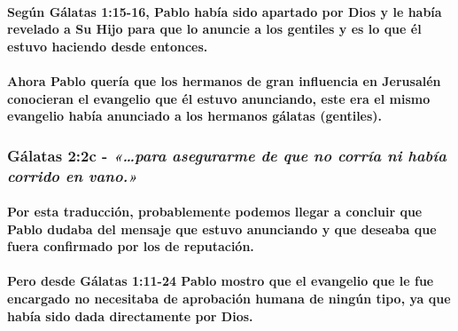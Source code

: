 \documentclass[11a pt,twoside]{article}
\newcommand{\scripture}[1]{%
  {\fontsize{12pt}{16pt}\selectfont\ScriptureFont\itshape #1}%
}
\def\textbf#1{#1}%
\let\oldsubsubsection\subsubsection
\renewcommand{\subsubsection}{\needspace{4\baselineskip}\oldsubsubsection}
\let\oldparagraph\paragraph
\renewcommand{\paragraph}{\needspace{3\baselineskip}\oldparagraph}
\begin{document}
\paragraph{Según Gálatas 1:15-16, Pablo había sido apartado por Dios y
le había revelado a Su Hijo para que lo anuncie a los gentiles y es lo
que él estuvo haciendo desde
entonces.}\label{seguxfan-guxe1latas-115-16-pablo-habuxeda-sido-apartado-por-dios-y-le-habuxeda-revelado-a-su-hijo-para-que-lo-anuncie-a-los-gentiles-y-es-lo-que-uxe9l-estuvo-haciendo-desde-entonces.}

\paragraph{\texorpdfstring{Ahora Pablo quería que los hermanos de gran
influencia en Jerusalén conocieran el evangelio que él estuvo
anunciando, este era \textbf{el mismo evangelio} había anunciado a los
hermanos gálatas
(gentiles).}{Ahora Pablo quería que los hermanos de gran influencia en Jerusalén conocieran el evangelio que él estuvo anunciando, este era el mismo evangelio había anunciado a los hermanos gálatas (gentiles).}}\label{ahora-pablo-queruxeda-que-los-hermanos-de-gran-influencia-en-jerusaluxe9n-conocieran-el-evangelio-que-uxe9l-estuvo-anunciando-este-era-el-mismo-evangelio-habuxeda-anunciado-a-los-hermanos-guxe1latas-gentiles.}

\subsubsection{\texorpdfstring{Gálatas 2:2c -
\scripture{«…para asegurarme de que no corría ni había corrido en vano.»}}{Gálatas 2:2c - }}\label{guxe1latas-22c---para-asegurarme-de-que-no-corruxeda-ni-habuxeda-corrido-en-vano.}

\paragraph{Por esta traducción, probablemente podemos llegar a concluir
que Pablo dudaba del mensaje que estuvo anunciando y que deseaba que
fuera confirmado por los de
reputación.}\label{por-esta-traducciuxf3n-probablemente-podemos-llegar-a-concluir-que-pablo-dudaba-del-mensaje-que-estuvo-anunciando-y-que-deseaba-que-fuera-confirmado-por-los-de-reputaciuxf3n.}

\paragraph{Pero desde Gálatas 1:11-24 Pablo mostro que el evangelio que
le fue encargado no necesitaba de aprobación humana de ningún tipo, ya
que había sido dada directamente por
Dios.}\label{pero-desde-guxe1latas-111-24-pablo-mostro-que-el-evangelio-que-le-fue-encargado-no-necesitaba-de-aprobaciuxf3n-humana-de-ninguxfan-tipo-ya-que-habuxeda-sido-dada-directamente-por-dios.}
\end{document}
